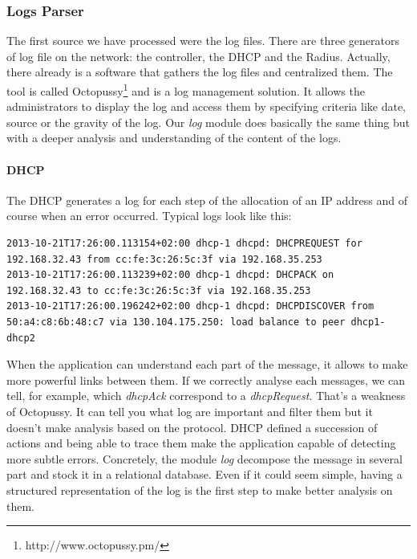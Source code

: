 \subsubsection{Logs Parser}
The first source we have processed were the log files. There are three generators of log file on the network: the controller, the DHCP and the Radius. Actually, there already is a software that gathers the log files and centralized them. The tool is called Octopussy\footnote{http://www.octopussy.pm/} and is a log management solution. It allows the administrators to display the log and access them by specifying criteria like date, source or the gravity of the log. Our \emph{log} module does basically the same thing but with a deeper analysis and understanding of the content of the logs. 
\paragraph{DHCP}
The DHCP generates a log for each step of the allocation of an IP address and of course when an error occurred. Typical logs look like this:
\begin{lstlisting}[frame=single,breaklines=true,caption={DHCP logs}]
2013-10-21T17:26:00.113154+02:00 dhcp-1 dhcpd: DHCPREQUEST for 192.168.32.43 from cc:fe:3c:26:5c:3f via 192.168.35.253
2013-10-21T17:26:00.113239+02:00 dhcp-1 dhcpd: DHCPACK on 192.168.32.43 to cc:fe:3c:26:5c:3f via 192.168.35.253
2013-10-21T17:26:00.196242+02:00 dhcp-1 dhcpd: DHCPDISCOVER from 50:a4:c8:6b:48:c7 via 130.104.175.250: load balance to peer dhcp1-dhcp2
\end{lstlisting}
When the application can understand each part of the message, it allows to make more powerful links between them. If we correctly analyse each messages, we can tell, for example, which \emph{dhcpAck} correspond to a \emph{dhcpRequest}. That's a weakness of Octopussy. It can tell you what log are important and filter them but it doesn't make analysis based on the protocol. DHCP defined a succession of actions and being able to trace them make the application capable of detecting more subtle errors. Concretely, the module \emph{log} decompose the message in several part and stock it in a relational database. Even if it could seem simple, having a structured representation of the log is the first step to make better analysis on them.

